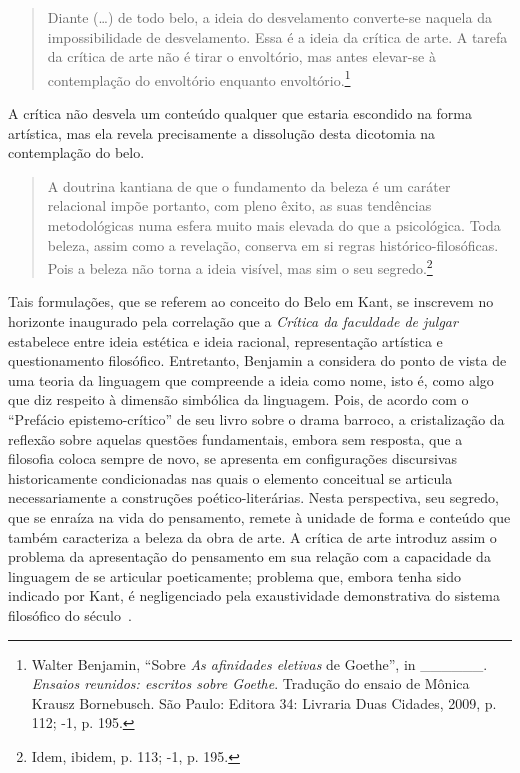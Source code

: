 \begin{quote}
Diante (\ldots{}) de todo belo, a ideia do desvelamento converte-se naquela
da impossibilidade de desvelamento. Essa é a ideia da crítica de arte. A
tarefa da crítica de arte não é tirar o envoltório, mas antes elevar-se
à contemplação do envoltório enquanto envoltório.\footnote{Walter
  Benjamin, ``Sobre \emph{As afinidades eletivas} de Goethe'', in
  \_\_\_\_\_\_. \emph{Ensaios reunidos: escritos sobre Goethe}. Tradução
  do ensaio de Mônica Krausz Bornebusch. São Paulo: Editora 34: Livraria
  Duas Cidades, 2009, p. 112;  -1, p. 195.}
\end{quote}

A crítica não desvela um conteúdo qualquer que estaria escondido na
forma artística, mas ela revela precisamente a dissolução desta
dicotomia na contemplação do belo.

\begin{quote}
A doutrina kantiana de que o fundamento da beleza é um caráter
relacional impõe portanto, com pleno êxito, as suas tendências
metodológicas numa esfera muito mais elevada do que a psicológica. Toda
beleza, assim como a revelação, conserva em si regras
histórico-filosóficas. Pois a beleza não torna a ideia visível, mas sim
o seu segredo.\footnote{Idem, ibidem, p. 113;  -1, p. 195.}
\end{quote}

Tais formulações, que se referem ao conceito do Belo em Kant, se
inscrevem no horizonte inaugurado pela correlação que a \emph{Crítica da
faculdade de julgar} estabelece entre ideia estética e ideia racional,
representação artística e questionamento filosófico. Entretanto,
Benjamin a considera do ponto de vista de uma teoria da linguagem que
compreende a ideia como nome, isto é, como algo que diz respeito à
dimensão simbólica da linguagem. Pois, de acordo com o ``Prefácio
epistemo-crítico'' de seu livro sobre o drama barroco, a cristalização
da reflexão sobre aquelas questões fundamentais, embora sem resposta,
que a filosofia coloca sempre de novo, se apresenta em configurações
discursivas historicamente condicionadas nas quais o elemento conceitual
se articula necessariamente a construções poético-literárias. Nesta
perspectiva, seu segredo, que se enraíza na vida do pensamento, remete à
unidade de forma e conteúdo que também caracteriza a beleza da obra de
arte. A crítica de arte introduz assim o problema da apresentação do
pensamento em sua relação com a capacidade da linguagem de se articular
poeticamente; problema que, embora tenha sido indicado por Kant, é
negligenciado pela exaustividade demonstrativa do sistema filosófico do
século~.

